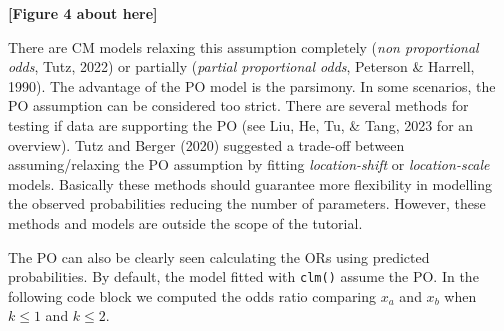 \documentclass[
  man,floatsintext]{apa6}
\newenvironment{Shaded}{\begin{snugshade}}{\end{snugshade}}
\newcommand{\AttributeTok}[1]{\textcolor[rgb]{0.13,0.29,0.53}{#1}}
\newcommand{\CommentTok}[1]{\textcolor[rgb]{0.56,0.35,0.01}{\textit{#1}}}
\newcommand{\DecValTok}[1]{\textcolor[rgb]{0.00,0.00,0.81}{#1}}
\newcommand{\FunctionTok}[1]{\textcolor[rgb]{0.13,0.29,0.53}{\textbf{#1}}}
\newcommand{\NormalTok}[1]{#1}
\newcommand{\OtherTok}[1]{\textcolor[rgb]{0.56,0.35,0.01}{#1}}
\newcommand{\SpecialCharTok}[1]{\textcolor[rgb]{0.81,0.36,0.00}{\textbf{#1}}}
\newcommand{\StringTok}[1]{\textcolor[rgb]{0.31,0.60,0.02}{#1}}
\begin{document}
\begin{center}\textbf{[Figure 4 about here]} \end{center}

\normalsize

There are CM models relaxing this assumption completely (\emph{non proportional odds}, Tutz, 2022) or partially (\emph{partial proportional odds}, Peterson \& Harrell, 1990). The advantage of the PO model is the parsimony. In some scenarios, the PO assumption can be considered too strict. There are several methods for testing if data are supporting the PO (see Liu, He, Tu, \& Tang, 2023 for an overview). Tutz and Berger (2020) suggested a trade-off between assuming/relaxing the PO assumption by fitting \emph{location-shift} or \emph{location-scale} models. Basically these methods should guarantee more flexibility in modelling the observed probabilities reducing the number of parameters. However, these methods and models are outside the scope of the tutorial.

The PO can also be clearly seen calculating the ORs using predicted probabilities. By default, the model fitted with \texttt{clm()} assume the PO. In the following code block we computed the odds ratio comparing \(x_a\) and \(x_b\) when \(k \leq 1\) and \(k \leq 2\).

\scriptsize

\begin{Shaded}
\end{Shaded}
\end{document}
